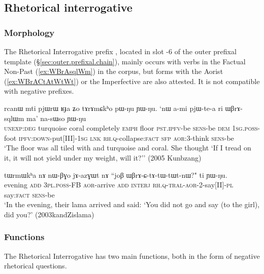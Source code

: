 
\subsection{Rhetorical interrogative} \label{sec:WBrA} 

\subsubsection{Morphology} \label{sec:WBrA.morphology} 
The Rhetorical Interrogative prefix , located in slot -6 of the outer prefixal template (§\ref{sec:outer.prefixal.chain}),  mainly occurs with verbs in the Factual Non-Past (\ref{ex:WBrAsqlWm}) in the corpus, but forms with the Aorist (\ref{ex:WBrACtAtWtWt}) or the Imperfective are also attested. It is not compatible with negative prefixes.

\begin{exe}
\ex \label{ex:WBrAsqlWm}
\gll rcanɯ mti pjɯrɯ ʁɟa ʑo tɤrɤmɕkʰo pɯ-ŋu ɲɯ-ŋu. `nɯ a-mi pjɯ-te-a ri ɯβrɤ-sqlɯm ma' na-sɯso ɲɯ-ŋu \\
\textsc{unexp}:\textsc{deg} turquoise  coral completely \textsc{emph} floor \textsc{pst}.\textsc{ipfv}-be \textsc{sens}-be \textsc{dem} \textsc{1sg}.\textsc{poss}-foot \textsc{ipfv}:\textsc{down}-put[III]-\textsc{1sg} \textsc{lnk} \textsc{rh}.\textsc{q}-collapse:\textsc{fact} \textsc{sfp} \textsc{aor}:3\flobv{}-think \textsc{sens}-be \\
\glt `The floor was all tiled with and turquoise and coral. She thought `If I tread on it, it will not yield under my weight, will it?'' (2005 Kunbzang)
\end{exe}

\begin{exe}
\ex \label{ex:WBrACtAtWtWt}
\gll tɯrmɯkʰa nɤ nɯ-βɣo jɤ-azɣɯt nɤ ``joβ ɯβrɤ-ɕ-tɤ-tɯ-tɯt-nɯ?" ti ɲɯ-ŋu. \\
evening \textsc{add} \textsc{3pl}.\textsc{poss}-FB \textsc{aor}-arrive \textsc{add} \textsc{interj} \textsc{rh}.\textsc{q}-\textsc{tral}-\textsc{aor}-2-say[II]-\textsc{pl} say:\textsc{fact} \textsc{sens}-be \\
\glt `In the evening, their lama arrived and said: `You did not go and say  (to the girl), did you?' (2003kandZislama)
 \end{exe}
 
\subsubsection{Functions} \label{sec:WBrA.functions} 
The Rhetorical Interrogative has two main functions, both in the form of negative rhetorical questions. 

